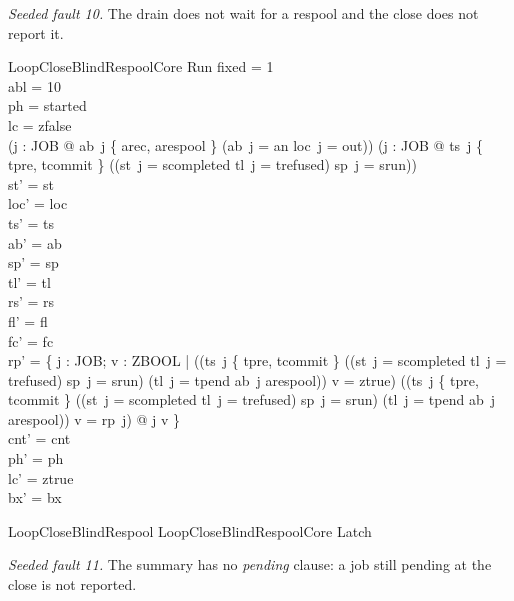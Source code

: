 \documentclass[a4paper,10pt,fleqn]{article}
\begin{document}
\emph{Seeded fault 10.} The drain does not wait for a respool and the close does not
report it.

\begin{schema}{LoopCloseBlindRespoolCore}
\Delta Run
\where
fixed = 1 \\
abl = 10 \\
ph = started \\
lc = zfalse \\
(\forall j : JOB @ ab~j \in \{ arec, arespool \} \lor (ab~j = an \land loc~j = out)) \land (\forall j : JOB @ ts~j \notin \{ tpre, tcommit \} \land \lnot ((st~j = scompleted \lor tl~j = trefused) \land sp~j = srun)) \\
st' = st \\
loc' = loc \\
ts' = ts \\
ab' = ab \\
sp' = sp \\
tl' = tl \\
rs' = rs \\
fl' = fl \\
fc' = fc \\
rp' = \{ j : JOB; v : ZBOOL | ((ts~j \in \{ tpre, tcommit \} \lor ((st~j = scompleted \lor tl~j = trefused) \land sp~j = srun) \lor (tl~j = tpend \land ab~j \neq arespool)) \land v = ztrue) \lor (\lnot (ts~j \in \{ tpre, tcommit \} \lor ((st~j = scompleted \lor tl~j = trefused) \land sp~j = srun) \lor (tl~j = tpend \land ab~j \neq arespool)) \land v = rp~j) @ j \mapsto v \} \\
cnt' = cnt \\
ph' = ph \\
lc' = ztrue \\
bx' = bx
\end{schema}

\begin{zed}
LoopCloseBlindRespool  LoopCloseBlindRespoolCore \land Latch
\end{zed}

\emph{Seeded fault 11.} The summary has no \emph{pending} clause: a job still pending
at the close is not reported.
\end{document}
